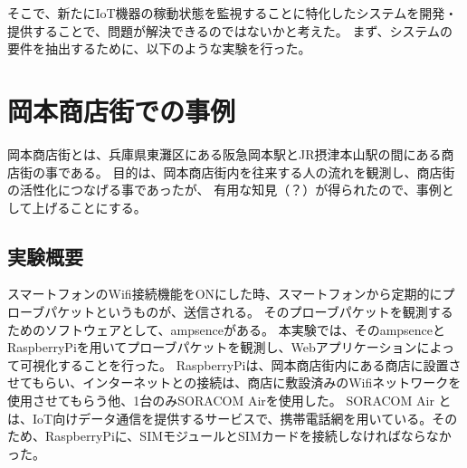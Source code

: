 そこで、新たにIoT機器の稼動状態を監視することに特化したシステムを開発・提供することで、問題が解決できるのではないかと考えた。
まず、システムの要件を抽出するために、以下のような実験を行った。

\section{岡本商店街での事例}
岡本商店街とは、兵庫県東灘区にある阪急岡本駅とJR摂津本山駅の間にある商店街の事である。
目的は、岡本商店街内を往来する人の流れを観測し、商店街の活性化につなげる事であったが、
有用な知見（？）が得られたので、事例として上げることにする。

\subsection{実験概要}
スマートフォンのWifi接続機能をONにした時、スマートフォンから定期的にプローブパケットというものが、送信される。
そのプローブパケットを観測するためのソフトウェアとして、ampsenceがある。
本実験では、そのampsenceとRaspberryPiを用いてプローブパケットを観測し、Webアプリケーションによって可視化することを行った。
RaspberryPiは、岡本商店街内にある商店に設置させてもらい、インターネットとの接続は、商店に敷設済みのWifiネットワークを使用させてもらう他、1台のみSORACOM Airを使用した。
SORACOM Air とは、IoT向けデータ通信を提供するサービスで、携帯電話網を用いている。そのため、RaspberryPiに、SIMモジュールとSIMカードを接続しなければならなかった。

